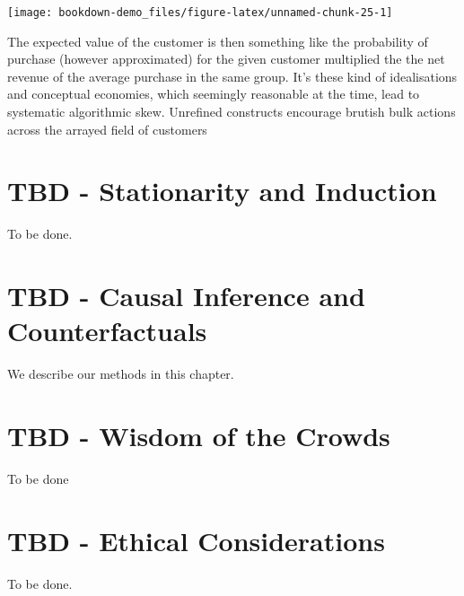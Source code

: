 \documentclass[]{tufte-book}
\theoremstyle{definition}
\theoremstyle{definition}
\theoremstyle{definition}
\theoremstyle{remark}
\begin{document}
\texttt{[image: bookdown-demo\_files/figure-latex/unnamed-chunk-25-1]}

The expected value of the customer is then something like the probability of purchase (however approximated) for the given customer multiplied the the net revenue of the average purchase in the same group. It's these kind of idealisations and conceptual economies, which seemingly reasonable at the time, lead to systematic algorithmic skew. Unrefined constructs encourage brutish bulk actions across the arrayed field of customers

\hypertarget{tbd---stationarity-and-induction}{%
\chapter{TBD - Stationarity and Induction}\label{tbd---stationarity-and-induction}}

To be done.

\hypertarget{tbd---causal-inference-and-counterfactuals}{%
\chapter{TBD - Causal Inference and Counterfactuals}\label{tbd---causal-inference-and-counterfactuals}}

We describe our methods in this chapter.

\hypertarget{tbd---wisdom-of-the-crowds}{%
\chapter{TBD - Wisdom of the Crowds}\label{tbd---wisdom-of-the-crowds}}

To be done

\hypertarget{tbd---ethical-considerations}{%
\chapter{TBD - Ethical Considerations}\label{tbd---ethical-considerations}}

To be done.


\end{document}
